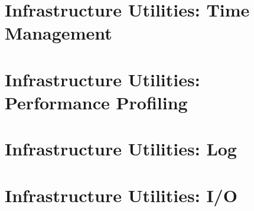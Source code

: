 \documentclass[english]{article}
\newcommand{\shortname}{GR}
\begin{document}
\newpage
\begin{htmlonly}
\end{htmlonly}
\part{Infrastructure Utilities: Time Management}

\setcounter{section}{0}
\renewcommand{\thesection}{\shortname\arabic{section}}
\renewcommand{\thesubsection}{\shortname\arabic{section}.\arabic{subsection}}
\renewcommand{\thesubsubsection}{\shortname\arabic{section}.\arabic{subsection}.\arabic{subsubsection}}



\newpage
\begin{htmlonly}
\end{htmlonly}
\part{Infrastructure Utilities: Performance Profiling}

\setcounter{section}{0}
\renewcommand{\thesection}{\shortname\arabic{section}}
\renewcommand{\thesubsection}{\shortname\arabic{section}.\arabic{subsection}}
\renewcommand{\thesubsubsection}{\shortname\arabic{section}.\arabic{subsection}.\arabic{subsubsection}}



\newpage
\begin{htmlonly}
\end{htmlonly}
\part{Infrastructure Utilities: Log}

\setcounter{section}{0}
\renewcommand{\thesection}{\shortname\arabic{section}}
\renewcommand{\thesubsection}{\shortname\arabic{section}.\arabic{subsection}}
\renewcommand{\thesubsubsection}{\shortname\arabic{section}.\arabic{subsection}.\arabic{subsubsection}}



\newpage
\begin{htmlonly}
\end{htmlonly}
\part{Infrastructure Utilities: I/O}

\setcounter{section}{0}
\renewcommand{\thesection}{\shortname\arabic{section}}
\renewcommand{\thesubsection}{\shortname\arabic{section}.\arabic{subsection}}
\renewcommand{\thesubsubsection}{\shortname\arabic{section}.\arabic{subsection}.\arabic{subsubsection}}


\end{document}
